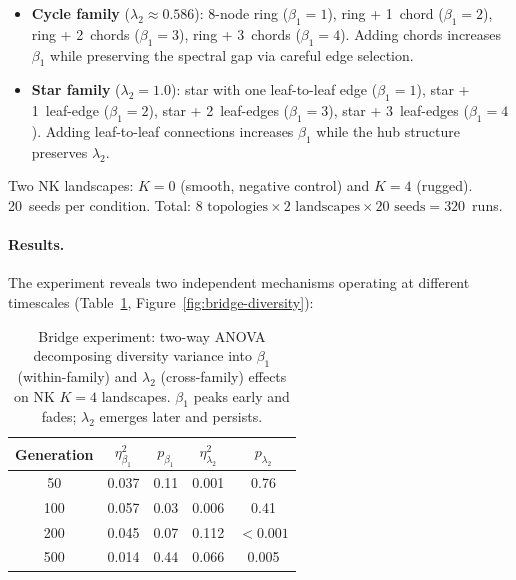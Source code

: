 \documentclass[runningheads]{llncs}
\begin{document}
\begin{itemize}[nosep]
  \item \textbf{Cycle family} ($\lambda_2 \approx 0.586$): 8-node
    ring ($\beta_1 = 1$), ring + 1~chord ($\beta_1 = 2$), ring +
    2~chords ($\beta_1 = 3$), ring + 3~chords ($\beta_1 = 4$). Adding
    chords increases $\beta_1$ while preserving the spectral gap via
    careful edge selection.

  \item \textbf{Star family} ($\lambda_2 = 1.0$): star with one
    leaf-to-leaf edge ($\beta_1 = 1$), star + 1~leaf-edge ($\beta_1 = 2$), star +
    2~leaf-edges ($\beta_1 = 3$), star + 3~leaf-edges ($\beta_1 = 4$).
    Adding leaf-to-leaf connections increases $\beta_1$ while the
    hub structure preserves $\lambda_2$.
\end{itemize}

\noindent
Two NK landscapes: $K = 0$ (smooth, negative control) and $K = 4$
(rugged). 20~seeds per condition. Total: $8 \text{ topologies} \times
2 \text{ landscapes} \times 20 \text{ seeds} = 320$~runs.

\paragraph{Results.}
The experiment reveals two independent mechanisms operating at
different timescales (Table~\ref{tab:bridge}, Figure~\ref{fig:bridge-diversity}):

\begin{table}[t]
\centering
\caption{Bridge experiment: two-way ANOVA decomposing diversity
variance into $\beta_1$ (within-family) and $\lambda_2$
(cross-family) effects on NK $K = 4$ landscapes. $\beta_1$ peaks
early and fades; $\lambda_2$ emerges later and persists.}
\label{tab:bridge}
\begin{tabular}{@{}ccccc@{}}
\toprule
Generation & $\eta^2_{\beta_1}$ & $p_{\beta_1}$ &
$\eta^2_{\lambda_2}$ & $p_{\lambda_2}$ \\
\midrule
50  & 0.037 & 0.11 & 0.001 & 0.76 \\
100 & 0.057 & 0.03 & 0.006 & 0.41 \\
200 & 0.045 & 0.07 & 0.112 & $< 0.001$ \\
500 & 0.014 & 0.44 & 0.066 & 0.005 \\
\bottomrule
\end{tabular}
\end{table}
\end{document}
